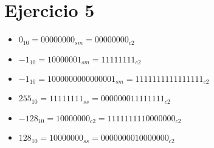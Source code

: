 \section*{Ejercicio 5}

\begin{itemize}
    \item $ 0_{10} = 00000000_{sm} = 00000000_{c2} $
    \item $ -1_{10} = 10000001_{sm} = 11111111_{c2} $
    \item $ -1_{10} = 1000000000000001_{sm} = 1111111111111111_{c2} $
    \item $ 255_{10} = 11111111_{ss} = 000000011111111_{c2} $
    \item $ -128_{10} = 10000000_{c2} = 1111111110000000_{c2} $
    \item $ 128_{10} = 10000000_{ss} = 0000000010000000_{c2} $
\end{itemize}